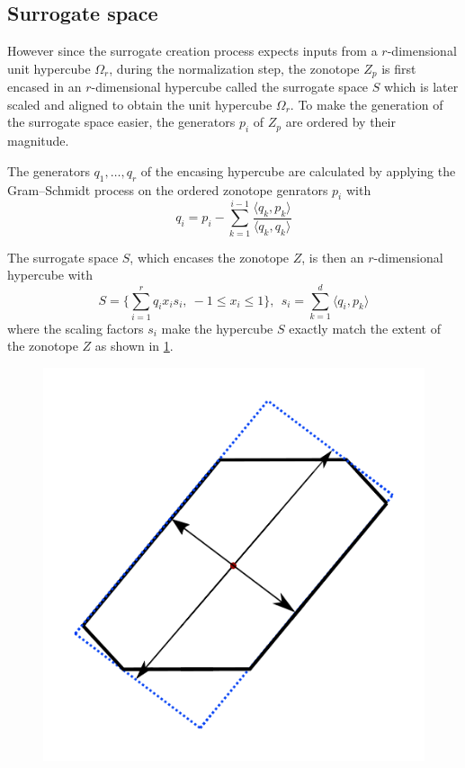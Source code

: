 \documentclass[
  a4paper,  %
  twoside,  %
  bibliography=totoc,
  headsepline,
  cleardoublepage=empty,
  parskip=half,
  draft=false
]{scrbook}
\begin{document}
\subsection{Surrogate space}

However since the surrogate creation process expects inputs from a $r$-dimensional unit hypercube $\Omega_r$, during the normalization step, the zonotope $Z_p$ is first encased in an $r$-dimensional hypercube called the surrogate space $S$ which is later scaled and aligned to obtain the unit hypercube $\Omega_r$.
To make the generation of the surrogate space easier, the generators $p_i$ of $Z_p$ are ordered by their magnitude.

The generators $q_1, \dots, q_r$ of the encasing hypercube are calculated by applying the Gram–Schmidt process on the ordered zonotope genrators $p_i$ with
\begin{equation}
q_i=p_i - \sum_{k=1}^{i-1} \frac{\langle q_k, p_k\rangle}{\langle q_k, q_k\rangle}
\nonumber
\end{equation}

The surrogate space $S$, which encases the zonotope $Z$, is then an $r$-dimensional hypercube with
\begin{equation}
S=\{\sum_{i=1}^r q_i x_i s_i , ~ -1 \leq x_i \leq 1\},~~ s_i=\sum_{k=1}^d \langle q_i, p_k\rangle
\label{surrogate_space}
\end{equation}
where the scaling factors $s_i$ make the hypercube $S$ exactly match the extent of the zonotope $Z$ as shown in \ref{fig:surrogate_space}.


\begin{figure}[H]
\centering
  \includegraphics[width=0.4\linewidth]{graphics/s}
  \label{fig:surrogate_space}
\end{figure}
\end{document}
